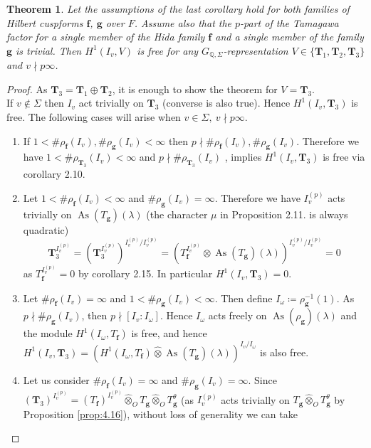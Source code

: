 \documentclass[10pt]{amsart}
\numberwithin{equation}{section}
\newtheorem{thm}{Theorem}[section]
\theoremstyle{definition}
\theoremstyle{remark} %
\newcommand{\As}{\operatorname{As}}
\newcommand{\f}{\mathbf{f}}
\newcommand{\g}{\mathbf{g}}
\newcommand{\Q}{\mathbb{Q}}
\newcommand{\T}{\mathbf{T}}
\begin{document}
	
	\begin{thm}
		Let the assumptions of the last corollary hold for both families of Hilbert cuspforms $ \f $, $ \g $ over $ F $. Assume also that the $p$-part of the Tamagawa factor for a single member of the Hida family $\f$ and a single member of the family $\g$ is trivial. Then $H^1(I_v , V )$ is free for any $ G_{\Q,\Sigma} $-representation $V \in \{\T_1, \T_2, \T_3\}$ and $ v \nmid p\infty $.
	\end{thm}
	\begin{proof}
		As  $ \T_3 = \T_1 \oplus \T_2 $, it is enough to show the theorem for $ V = \T_3 $. \\
		If $ v \notin \Sigma $ then $ I_v $ act trivially on $ \T_3 $ (converse is also true). Hence $H^1(I_v , \T_3 )$ is free. The following cases will arise when $ v \in \Sigma, \: v \nmid p\infty $. 
		\begin{enumerate}
			\item If $ 1 < \#\rho_{\f}(I_v),\#\rho_{\g}(I_v) < \infty $ then $ p \nmid \#\rho_{\f}(I_v),\#\rho_{\g}(I_v) $. Therefore we have $ 1< \#\rho_{\T_3}(I_v) < \infty $ and $ p \nmid \#\rho_{\T_3}(I_v) $ , implies $ H^1(I_v , \T_3) $ is free via corollary 2.10.
			\item Let $ 1 < \#\rho_{\f}(I_v) < \infty $ and $ \#\rho_{\g}(I_v) = \infty $. Therefore we have  $ I_v^{(p)} $ acts trivially on $ \As(T_\g)(\lambda) $ (the character $ \mu$ in Proposition 2.11. is always quadratic)
			$$ \T_3^{I_v^{(p)}} = (\T_3^{I_v^{(p)}})^{I_v^{(p)}/I_v^{(p)}} = (T_\f^{I_v^{(p)}} \otimes \As(T_\g)(\lambda))^{I_v^{(p)}/I_v^{(p)}} = 0 $$ 
			as $T_\f^{I_v^{(p)}} = 0$ by corollary 2.15. In particular $ H^1(I_v , \T_3) =0$. 
			\item Let $ \#\rho_{\f}(I_v) = \infty $ and $ 1 < \#\rho_{\g}(I_v) < \infty $. Then define $ I_\omega \coloneqq \rho_{\g}^{-1}(1) $. As $ p \nmid \#\rho_{\g}(I_v) $, then $ p \nmid [I_v \colon I_\omega] $. Hence $ I_\omega $ acts freely on $ \As(\rho_{\g})(\lambda) $ and the module $ H^1(I_\omega, T_\f) $ is free, and hence $ H^1(I_v,  \T_3) =(H^1(I_\omega, T_\f)\widehat{\otimes}\As(T_\g)(\lambda))^{I_v/I_\omega}  $ is also free. 
			\item Let us consider $\#\rho_{\f}(I_v) = \infty$ and $\#\rho_{\g}(I_v) = \infty$. Since $(\T_3)^{I_v^{(p)}} = (T_{\f})^{I_v^{(p)}} \widehat{\otimes}_{O} T_{\g}\widehat{\otimes}_{O} T_{\g}^\theta$ (as $I_v^{(p)}$ acts trivially on $T_{\g} \widehat{\otimes}_{O}T_{\g}^\theta$ by Proposition \ref{prop:4.16}), without loss of generality we can take 

\end{enumerate}
\end{proof}
\end{document}
